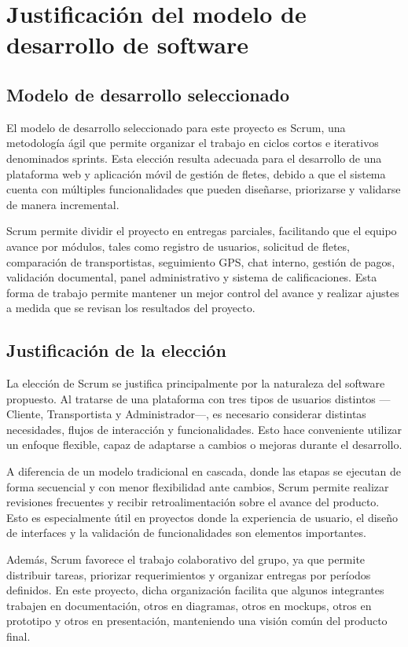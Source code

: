 \chapter{Justificación del modelo de desarrollo de software}
\label{Justificación del modelo de desarrollo de software}

\section{Modelo de desarrollo seleccionado}
El modelo de desarrollo seleccionado para este proyecto es Scrum, una metodología ágil que permite organizar el trabajo en ciclos cortos e iterativos denominados sprints. Esta elección resulta adecuada para el desarrollo de una plataforma web y aplicación móvil de gestión de fletes, debido a que el sistema cuenta con múltiples funcionalidades que pueden diseñarse, priorizarse y validarse de manera incremental.

Scrum permite dividir el proyecto en entregas parciales, facilitando que el equipo avance por módulos, tales como registro de usuarios, solicitud de fletes, comparación de transportistas, seguimiento GPS, chat interno, gestión de pagos, validación documental, panel administrativo y sistema de calificaciones. Esta forma de trabajo permite mantener un mejor control del avance y realizar ajustes a medida que se revisan los resultados del proyecto.

\section{Justificación de la elección}

La elección de Scrum se justifica principalmente por la naturaleza del software propuesto. Al tratarse de una plataforma con tres tipos de usuarios distintos —Cliente, Transportista y Administrador—, es necesario considerar distintas necesidades, flujos de interacción y funcionalidades. Esto hace conveniente utilizar un enfoque flexible, capaz de adaptarse a cambios o mejoras durante el desarrollo.

A diferencia de un modelo tradicional en cascada, donde las etapas se ejecutan de forma secuencial y con menor flexibilidad ante cambios, Scrum permite realizar revisiones frecuentes y recibir retroalimentación sobre el avance del producto. Esto es especialmente útil en proyectos donde la experiencia de usuario, el diseño de interfaces y la validación de funcionalidades son elementos importantes.

Además, Scrum favorece el trabajo colaborativo del grupo, ya que permite distribuir tareas, priorizar requerimientos y organizar entregas por períodos definidos. En este proyecto, dicha organización facilita que algunos integrantes trabajen en documentación, otros en diagramas, otros en mockups, otros en prototipo y otros en presentación, manteniendo una visión común del producto final.

